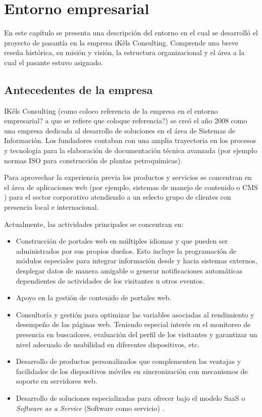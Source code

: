 \chapter{Entorno empresarial} \label{empresa}
En este capítulo se presenta una descripción del entorno en el cual se desarrolló el proyecto de pasantía en la empresa iKêls Consulting. Comprende una breve reseña histórica, su misión y visión, la estructura organizacional y el área a la cual el pasante estuvo asignado.

\section{Antecedentes de la empresa}
IKêls Consulting (como coloco referencia de la empresa en el entorno empresarial? a que se refiere que coloque referencia?) se creó el año 2008 como una empresa dedicada al desarrollo de soluciones en el área de Sistemas de Información. Los fundadores contaban con una amplia trayectoria en los procesos y tecnología para la elaboración de documentación técnica avanzada (por ejemplo normas ISO para construcción de plantas petroquímicas).

Para aprovechar la experiencia previa los productos y servicios se concentran en el área de aplicaciones web (por ejemplo, sistemas de manejo de contenido o CMS \cite{cmsBarker}) para el sector corporativo atendiendo a un selecto grupo de clientes con presencia local e internacional.

Actualmente, las actividades principales se concentran en:

\begin{itemize}
  \item Construcción de portales web en múltiples idiomas y que pueden ser administrados por sus propios dueños. Esto incluye la programación de módulos especiales para integrar información desde y hacia sistemas externos, desplegar datos de manera amigable o generar notificaciones automáticas dependientes de actividades de los visitantes u otros eventos.
  \item Apoyo en la gestión de contenido de portales web.
  \item Consultoría y gestión para optimizar las variables asociadas al rendimiento y desempeño de las páginas web. Teniendo especial interés en el monitoreo de presencia en buscadores, evaluación del perfil de los visitantes y garantizar un nivel adecuado de usabilidad en diferentes dispositivos, etc.
  \item Desarrollo de productos personalizados que complementen las ventajas y facilidades de los dispositivos móviles en sincronización con mecanismos de soporte en servidores web.
  \item Desarrollo de soluciones especializadas para ofrecer bajo el modelo SaaS o \textit{Software as a Service} (Software como servicio) \cite{saas}.
\end{itemize}

